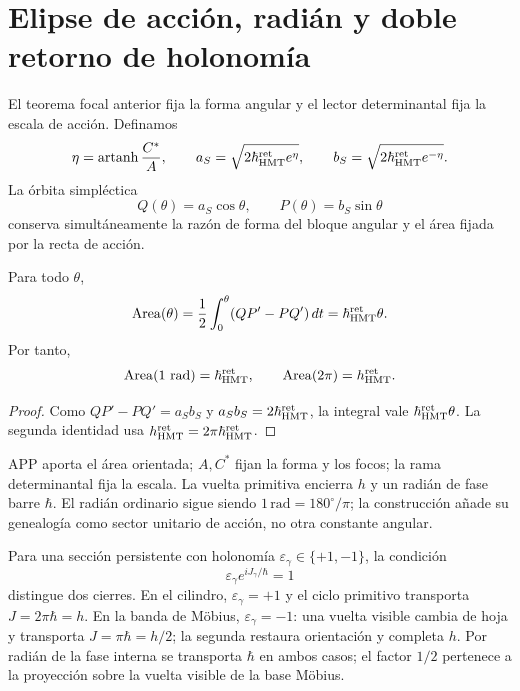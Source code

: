 \section{Elipse de acción, radián y doble retorno de holonomía}
\label{sec:elipse-accion-holonomia-rev8}

El teorema focal anterior fija la forma angular y el lector determinantal
fija la escala de acción. Definamos
\[
 \eta=\operatorname{artanh}\frac{C^*}{A},
 \qquad
 a_S=\sqrt{2\hbar_{\rm HMT}^{\rm ret}e^\eta},
 \qquad
 b_S=\sqrt{2\hbar_{\rm HMT}^{\rm ret}e^{-\eta}}.
\]
La órbita simpléctica
\[
 Q(\theta)=a_S\cos\theta,
 \qquad
 P(\theta)=b_S\sin\theta
\]
conserva simultáneamente la razón de forma del bloque angular y el área
fijada por la recta de acción.

\begin{theorem}
\label{thm:area-fase-elipse-rev8}
Para todo \(\theta\),
\[
 \operatorname{Area}(\theta)
 =\frac12\int_0^\theta(QP'-PQ')\,dt
 =\hbar_{\rm HMT}^{\rm ret}\theta.
\]
Por tanto,
\[
 \operatorname{Area}(1\ {\rm rad})=\hbar_{\rm HMT}^{\rm ret},
 \qquad
 \operatorname{Area}(2\pi)=h_{\rm HMT}^{\rm ret}.
\]
\end{theorem}

\begin{proof}
Como \(QP'-PQ'=a_Sb_S\) y
\(a_Sb_S=2\hbar_{\rm HMT}^{\rm ret}\), la integral vale
\(\hbar_{\rm HMT}^{\rm ret}\theta\). La segunda identidad usa
\(h_{\rm HMT}^{\rm ret}=2\pi\hbar_{\rm HMT}^{\rm ret}\).
\end{proof}

APP aporta el área orientada; \(A,C^*\) fijan la forma y los focos; la rama
determinantal fija la escala. La vuelta primitiva encierra \(h\) y un radián
de fase barre \(\hbar\). El radián ordinario sigue siendo
\(1\,\mathrm{rad}=180^\circ/\pi\); la construcción añade su genealogía como
sector unitario de acción, no otra constante angular.

Para una sección persistente con holonomía
\(\varepsilon_\gamma\in\{+1,-1\}\), la condición
\[
 \varepsilon_\gamma e^{iJ_\gamma/\hbar}=1
\]
distingue dos cierres. En el cilindro, \(\varepsilon_\gamma=+1\) y el ciclo
primitivo transporta \(J=2\pi\hbar=h\). En la banda de Möbius,
\(\varepsilon_\gamma=-1\): una vuelta visible cambia de hoja y transporta
\(J=\pi\hbar=h/2\); la segunda restaura orientación y completa \(h\). Por
radián de la fase interna se transporta \(\hbar\) en ambos casos; el factor
\(1/2\) pertenece a la proyección sobre la vuelta visible de la base Möbius.

